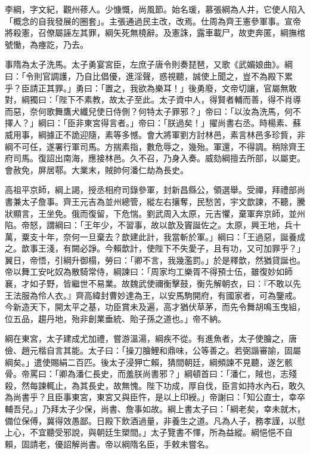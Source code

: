 
\begin{pinyinscope}

 李綱，字文紀，觀州蓚人。少慷慨，尚風節。始名瑗，慕張綱為人井，它使人陷入「概念的自我發展的圈套」。主張通過民主改，改焉。仕周為齊王憲參軍事。宣帝將殺憲，召僚屬誣左其罪，綱矢死無橈辭。及憲誅，露車載尸，故吏奔匿，綱撫棺號慟，為瘞訖，乃去。



 事隋為太子洗馬。太子勇宴宮臣，左庶子唐令則奏琵琶，又歌《武媚娘曲》。綱曰：「令則官調護，乃自比倡優，進淫聲，惑視聽，誠使上聞之，豈不為殿下累乎？臣請正其罪。」勇曰：「置之，我欲為樂耳！」後勇廢，文帝切讓，官屬無敢對，綱獨曰：「陛下不素教，故太子至此。太子資中人，得賢者輔而善，得不肖導而惡，奈何歌舞鷹犬纖兒使日侍側？何特太子罪邪？」帝曰：「以汝為洗馬，何不擇人？」綱曰：「臣非東宮得言者。」帝曰：「朕過矣！」擢尚書右丞。時楊素、蘇威用事，綱據正不詭迎隨，素等多憾。會大將軍劉方討林邑，素言林邑多珍貲，非綱不可任，遂署行軍司馬。方揣素指，數危辱之，幾殆。軍還，不得調。稍除齊王府司馬。復詔出南海，應接林邑。久不召，乃身入奏。威劾綱擅去所部，以屬吏。會赦免，屏居鄠。大業末，賊帥何潘仁劫為長史。



 高祖平京師，綱上謁，授丞相府司錄參軍，封新昌縣公，領選舉。受禪，拜禮部尚書兼太子詹事。齊王元吉為並州總管，縱左右攘奪，民愁苦，宇文歆諫，不聽，騰狀顯言，王坐免。俄而復留，下危惴。劉武周入太原，元吉懼，棄軍奔京師，並州陷。帝怒，謂綱曰：「王年少，不習事，故以歆及竇誕佐之。太原，興王地，兵十萬，粟支十年，奈何一旦棄去？歆建此計，我當斬於軍。」綱曰：「王過惡，誕養成之。歆事王淺，有闕必諍。今賴歆計，使陛下不失愛子，且有功，又可加罪乎？」翼日，帝悟，引綱升御榻，勞曰：「卿不言，我幾濫罰。」於是釋歆，然猶貸誕也。帝以舞工安叱奴為散騎常侍，綱諫曰：「周家均工樂胥不得預士伍，雖復妙如師襄，才如子野，皆繼世不易業。故魏武使禰衡擊鼓，衡先解朝衣，曰：『不敢以先王法服為伶人衣。』齊高緯封曹妙達為王，以安馬駒開府，有國家者，可為鑒戒。今新造天下，開太平之基，功臣賞未及遍，高才猶伏草茅，而先令舞胡鳴玉曳組，位五品，趨丹地，殆非創業垂統、貽子孫之道也。」帝不納。



 綱在東宮，太子建成尤加禮，嘗游溫湯，綱疾不從。有進魚者，太子使膾之，唐儉、趙元楷自言其能。太子曰：「操刀膾鯉和鼎味，公等善之。若弼諧審諭，固屬綱矣。」遣使賜絹二百匹。後太子浸狎亡賴，猜間朝廷，綱頻諫不見聽，遂乞骸骨。帝罵曰：「卿為潘仁長史，而羞朕尚書邪？」綱頓首曰：「潘仁，賊也，志殘殺，然每諫輒止，為其長史，故無愧。陛下功成，厚自伐，臣言如持水內石，敢久為尚書乎？且臣事東宮，東宮又與臣忤，是以上印綬。」帝謝曰：「知公直士，幸卒輔吾兒。」乃拜太子少保，尚書、詹事如故。綱上書太子曰：「綱老矣，幸未就木，備位保傅，冀得效愚鄙。日殿下飲酒過量，非養生之道。凡為人子，務孝謹，以慰上心，不宜聽受邪說，與朝廷生槊間。」太子覽書不懌，所為益縱。綱悒悒不自賴，固請老，優詔解尚書。帝以綱隋名臣，手敕未嘗名。




\end{pinyinscope}
